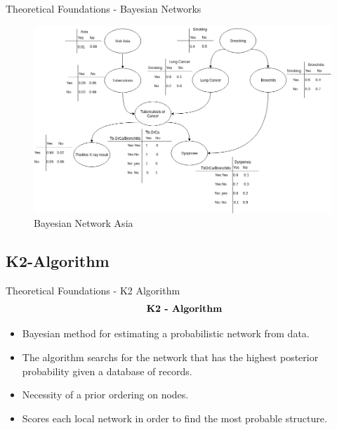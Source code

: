 \begin{frame}{Theoretical Foundations - Bayesian Networks}
    \begin{figure}[!h]
        \centering
        \includegraphics[scale=0.3]{figuras/asia_cpt.png}
        \caption{Bayesian Network Asia}
        \label{fig:asia}
    \end{figure}

\end{frame}



\subsection{K2-Algorithm}
\begin{frame}{Theoretical Foundations - K2 Algorithm}
    \begin{align*}
        \centering \textbf{ K2 - Algorithm}
    \end{align*}
    
    \begin{itemize}
        \item {Bayesian method for estimating a probabilistic network from data.}

        \item {The algorithm searchs for the network that has the highest posterior probability given a database of records.}
        \item {Necessity of a prior ordering on nodes.}
        \item { Scores each local network in order to find the most probable structure.}
    \end{itemize}
    
\end{frame}

